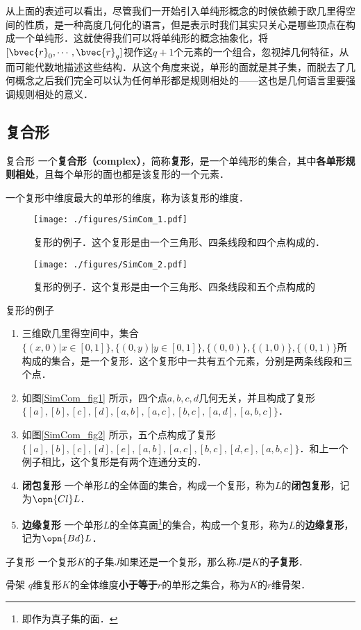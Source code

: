 从上面的表述可以看出，尽管我们一开始引入单纯形概念的时候依赖于欧几里得空间的性质，是一种高度几何化的语言，但是表示时我们其实只关心是哪些顶点在构成一个单纯形．这就使得我们可以将单纯形的概念抽象化，将$[\bvec{r}_0, \cdots, \bvec{r}_q]$视作这$q+1$个元素的一个组合，忽视掉几何特征，从而可能代数地描述这些结构．从这个角度来说，单形的面就是其子集，而脱去了几何概念之后我们完全可以认为任何单形都是规则相处的——这也是几何语言里要强调规则相处的意义．

\subsection{复合形}

\begin{definition}{复合形}
一个\textbf{复合形（complex）}，简称\textbf{复形}，是一个单纯形的集合，其中\textbf{各单形规则相处}，且每个单形的面也都是该复形的一个元素．

一个复形中维度最大的单形的维度，称为该复形的维度．
\end{definition}

\begin{figure}[ht]
\centering
\texttt{[image: ./figures/SimCom\_1.pdf]}
\caption{复形的例子．这个复形是由一个三角形、四条线段和四个点构成的．} \label{SimCom_fig1}
\end{figure}

\begin{figure}[ht]
\centering
\texttt{[image: ./figures/SimCom\_2.pdf]}
\caption{复形的例子．这个复形是由一个三角形、四条线段和五个点构成的} \label{SimCom_fig2}
\end{figure}


\begin{example}{复形的例子}
\begin{enumerate}
\item 三维欧几里得空间中，集合$\{(x, 0)|x\in[0,1]\}, \{(0, y)|y\in[0, 1]\}, \{(0, 0)\}, \{(1, 0)\}, \{(0, 1)\}$所构成的集合，是一个复形．这个复形中一共有五个元素，分别是两条线段和三个点．
\item 如图\autoref{SimCom_fig1} 所示，四个点$a, b, c, d$几何无关，并且构成了复形$\{[a], [b], [c], [d], [a, b], [a, c], [b, c], [a, d], [a, b, c]\}$．
\item 如图\autoref{SimCom_fig2} 所示，五个点构成了复形$\{[a], [b], [c], [d], [e], [a, b], [a, c], [b, c], [d, e], [a, b, c]\}$．和上一个例子相比，这个复形是有两个连通分支的．
\item \textbf{闭包复形} 一个单形$L$的全体面的集合，构成一个复形，称为$L$的\textbf{闭包复形}，记为$\opn{Cl} L$．
\item \textbf{边缘复形} 一个单形$L$的全体真面\footnote{即作为真子集的面．}的集合，构成一个复形，称为$L$的\textbf{边缘复形}，记为$\opn{Bd} L$．
\end{enumerate}
\end{example}

\begin{definition}{子复形}
一个复形$K$的子集$J$如果还是一个复形，那么称$J$是$K$的\textbf{子复形}．
\end{definition}

\begin{definition}{骨架}
$q$维复形$K$的全体维度\textbf{小于等于}$r$的单形之集合，称为$K$的$r$维骨架．
\end{definition}










